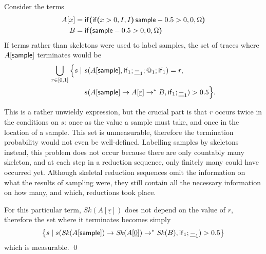\begin{example}
Consider the terms
\begin{align*}
A[x] &= \mathsf{if}\boldsymbol{(}\mathsf{if}\boldsymbol{(}x>0, I, I\boldsymbol{)} \, \mathsf{sample} - 0.5 > 0, 0, \Omega\boldsymbol{)}\\
B &= \mathsf{if}\boldsymbol{(}\mathsf{sample} - 0.5 > 0, 0, \Omega\boldsymbol{)}
\end{align*}
If terms rather than skeletons were used to label samples, the set of traces where $A[\mathsf{sample}]$ terminates would be
\begin{align*}
\bigcup_{r \in [0,1]} \Big\{s \mid\ & s(A[\mathsf{sample}], \mathsf{if}_1;\underline{-}_1;@_1;\mathsf{if}_1) = r, \\
& s(A[\mathsf{sample}] \to A[\underline r] \to^* B, \mathsf{if}_1 ; \underline{-}_1) > 0.5 \Big\}.
\end{align*}




\lo{I think we should write ``$[A[\tsample], A[\underline r], \ldots, B$'' in the line above as ``$A[\tsample] \to A[\underline r] \to^\ast B$''; similarly $\mathit{Sk}(A[\tsample]) \to \mathit{Sk}(A[\underline 0]) \to^\ast \mathit{Sk}(B)$ below.}
This is a rather unwieldy expression, but the crucial part is that $r$ occurs twice in the conditions on $s$: once as the value a sample must take, and once in the location of a sample. 
This set is unmeasurable, therefore the termination probability would not even be well-defined. 
Labelling samples by skeletons instead, this problem does not occur because there are only countably many skeleton, and at each step in a reduction sequence, only finitely many could have occurred yet. Although skeletal reduction sequences omit the information on what the results of sampling were, they still contain all the necessary information on how many, and which, reductions took place.

For this particular term, $\mathit{Sk}(A[\underline r])$ does not depend on the value of $r$, therefore the set where it terminates becomes simply
\begin{align*}
\big\{s \mid s(\mathit{Sk}(A[\mathsf{sample}]) \to \mathit{Sk}(A[\underline 0]) \to^* \mathit{Sk}(B), \mathsf{if}_1 ; \underline{-}_1) > 0.5 \big\}
\end{align*}
which is measurable.
\qed
\end{example}

